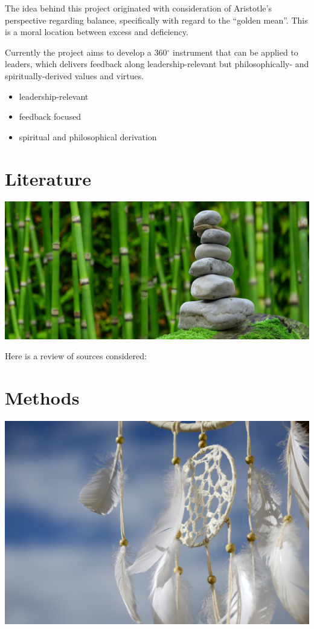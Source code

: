 \documentclass[
]{book}
\providecommand{\tightlist}{%
  \setlength{\itemsep}{0pt}\setlength{\parskip}{0pt}}
\begin{document}
The idea behind this project originated with consideration of Aristotle's perspective regarding balance, specifically with regard to the ``golden mean''. This is a moral location between excess and deficiency.

Currently the project aims to develop a 360\(^{\circ}\) instrument that can be applied to leaders, which delivers feedback along leadership-relevant but philosophically- and spiritually-derived values and virtues.

\begin{itemize}
\tightlist
\item
  leadership-relevant
\item
  feedback focused
\item
  spiritual and philosophical derivation
\end{itemize}

\hypertarget{literature}{%
\chapter{Literature}\label{literature}}

\includegraphics{stones-ge8c321976_1920.jpg}

Here is a review of sources considered:

\hypertarget{methods}{%
\chapter{Methods}\label{methods}}

\includegraphics{dream-catcher-g6ec41bb43_1920.jpg}
\end{document}

